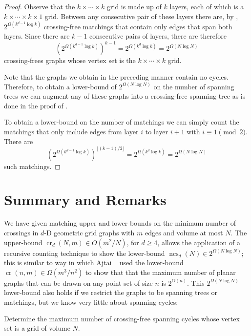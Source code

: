 \documentclass[12pt]{article}
\newcommand{\n}{N}
\DeclareMathOperator{\crs}{cr}
\DeclareMathOperator{\ncs}{ncs}
\begin{document}
\begin{proof}
  Observe that the $k\times\cdots\times k$ grid is made up of $k$ layers,
  each of which is a $k\times\cdots\times k\times1$ grid. Between any
  consecutive pair of these layers there are, by ,
  $2^{\Omega(k^{d-1}\log k)}$ crossing-free matchings that contain only
  edges that span both layers.  Since there are $k-1$ consecutive pairs
  of layers, there are therefore
  \[
     \left(2^{\Omega(k^{d-1}\log k)}\right)^{k-1} = 2^{\Omega(k^d\log k)} 
        = 2^{\Omega(\n\log\n)}
  \]
  crossing-frees graphs whose vertex set is the $k\times\cdots\times k$ grid.

  Note that the graphs we obtain in the preceding manner contain no
  cycles.  Therefore, to obtain a lower-bound of $2^{\Omega(\n\log
  \n)}$ on the number of spanning trees we can augment any of these
  graphs into a crossing-free spanning tree as is done in the proof of
  .

  To obtain a lower-bound on the number of matchings we can simply count
  the matchings that only include edges from layer $i$ to layer $i+1$
  with $i\equiv 1\pmod 2$.  There are
  \[
     \left(2^{\Omega(k^{d-1}\log k)}\right)^{\lfloor (k-1)/2\rfloor} 
       = 2^{\Omega(k^d\log k)}
       = 2^{\Omega(\n\log\n)}
  \]
  such matchings.
\end{proof}


\section{Summary and Remarks}

We have given matching upper and lower bounds on the minimum number of
crossings in $d$-D geometric grid graphs with $m$ edges and volume at
most $\n$.  The upper-bound $\crs_d(\n,m)\in O(m^2/\n)$, for $d\ge 4$,
allows the application of a recursive counting technique to show the
lower-bound $\ncs_d(\n)\in 2^{\Omega(\n\log\n)}$; this is similar to
way in which Ajtai \etal\ \cite{ajtai.chvatal.ea:crossing-free} used the
lower-bound $\crs(n,m)\in\Omega(m^3/n^2)$ to show that that the maximum
number of planar graphs that can be drawn on any point set of size $n$
is $2^{O(n)}$.  This $2^{\Omega(\n\log\n)}$ lower-bound also holds if
we restrict the graphs to be spanning trees or matchings, but we know
very little about spanning cycles:

\begin{op}
  Determine the maximum number of crossing-free spanning cycles whose
  vertex set is a grid of volume $\n$.
\end{op}
\end{document}
